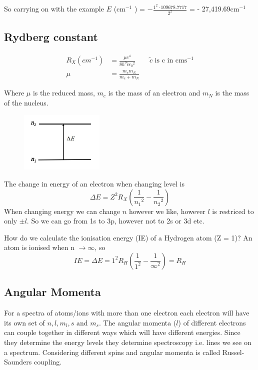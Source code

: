\documentclass{article}
\newcommand{\cm}{cm\(^{-1}\) }
\begin{document}
    So carrying on with the example $E$ (\cm) = $-\frac{1^2 \cdot 109678.7717}{2^2}$ = - 27,419.69\cm

    \subsection{Rydberg constant}
    \begin{align*}
        R_X (cm^{-1}) &= \frac{\mu e^4}{8h^3\tilde{c}\epsilon{_0}^2} \qquad \text{$\tilde{c}$ is c in cms$^{-1}$} \\
        \mu &= \frac{m_em_N}{m_e + m_N}
    \end{align*}

    Where $\mu$ is the reduced mass, $m_e$ is the mass of an electron and $m_N$ is the mass of the nucleus.

    \begin{figure}[h]
        \centering
        \includegraphics[width=4cm]{delte.jpg}
    \end{figure}

    The change in energy of an electron when changing level is 
    $$\Delta E = Z^2R_X\left(\frac{1}{n{_1} ^2}-\frac{1}{n{_2}^2}\right)$$
    When changing energy we can change $n$ however we like, however $l$ is restriced to only $\pm l$.
    So we can go from 1s to 3p, however not to 2s or 3d etc.

    How do we calculate the ionisation energy (IE) of a Hydrogen atom (Z = 1)? An atom is ionised when n $\rightarrow \infty$, so
    $$IE = \Delta E = 1^2R_H\left(\frac{1}{1^2}-\frac{1}{\infty^2}\right) = R_H$$

    \subsection{Angular Momenta}

    For a spectra of atoms/ions with more than one electron each electron will have its own set of 
    $n, l, m_l, s \text{ and } m_s$. The angular momenta ($l$) of different electrons can couple together in different ways
    which will have different energies. Since they determine the energy levels they determine spectroscopy i.e. lines we see on a spectrum.
    Considering different spins and angular momenta is called Russel-Saunders coupling.
\end{document}
